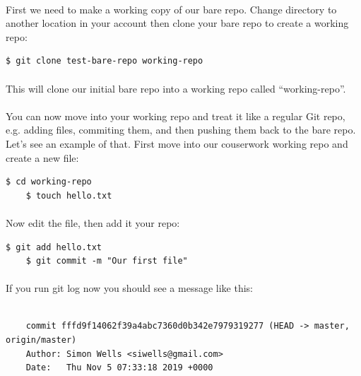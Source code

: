\documentclass[12pt, a4paper, oneside]{book}
\begin{document}
{\paragraph{} First we need to make a working copy of our bare repo. Change directory to another location in your account then clone your bare repo to create a working repo:

\begin{lstlisting}[style=DOS]
    $ git clone test-bare-repo working-repo
\end{lstlisting}

\paragraph{} This will clone our initial bare repo into a working repo called ``working-repo''.

\paragraph{} You can now move into your working repo and treat it like a regular Git repo, e.g. adding files, commiting them, and then pushing them back to the bare repo. Let's see an example of that. First move into our couserwork working repo and create a new file:

\begin{lstlisting}[style=DOS]
    $ cd working-repo
    $ touch hello.txt
\end{lstlisting}

\paragraph{} Now edit the file, then add it your repo:

\begin{lstlisting}[style=DOS]
    $ git add hello.txt
    $ git commit -m "Our first file"
\end{lstlisting}

\paragraph{} If you run git log now you should see a message like this:

\begin{lstlisting}[style=DOS]

    commit fffd9f14062f39a4abc7360d0b342e7979319277 (HEAD -> master, origin/master)
    Author: Simon Wells <siwells@gmail.com>
    Date:   Thu Nov 5 07:33:18 2019 +0000


\end{lstlisting}}
\end{document}
